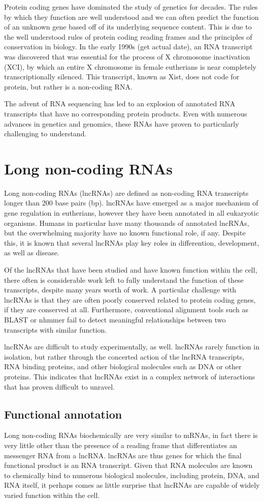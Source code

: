 Protein coding genes have dominated the study of genetics for decades. The rules by which they function are well understood and we can often predict the function of an unknown gene based off of its underlying sequence content. This is due to the well understood rules of protein coding reading frames and the principles of conservation in biology. In the early 1990s (get actual date), an RNA transcript was discovered that was essential for the process of X chromosome inactivation (XCI), by which an entire X chromosome in female eutherians is near completely transcriptionally silenced. This transcript, known as Xist, does not code for protein, but rather is a non-coding RNA.

The advent of RNA sequencing has led to an explosion of annotated RNA transcripts that have no corresponding protein products. Even with numerous advances in genetics and genomics, these RNAs have proven to particularly challenging to understand. 
\section{Long non-coding RNAs}
Long non-coding RNAs (lncRNAs) are defined as non-coding RNA transcripts longer than 200 base pairs (bp). lncRNAs have emerged as a major mechanism of gene regulation in eutherians, however they have been annotated in all eukaryotic organisms. Humans in particular have many thousands of annotated lncRNAs, but the overwhelming majority have no known functional role, if any. Despite this, it is known that several lncRNAs play key roles in differention, development, as well as disease. 

Of the lncRNAs that have been studied and have known function within the cell, there often is considerable work left to fully understand the function of these transcripts, despite many years worth of work. A particular challenge with lncRNAs is that they are often poorly conserved related to protein coding genes, if they are conserved at all. Furthermore, conventional alignment tools such as BLAST or nhmmer fail to detect meaningful relationships between two transcripts with similar function. 

lncRNAs are difficult to study experimentally, as well. lncRNAs rarely function in isolation, but rather through the concerted action of the lncRNA transcripts, RNA binding proteins, and other biological molecules such as DNA or other proteins. This indicates that lncRNAs exist in a complex network of interactions that has proven difficult to unravel. 
\subsection{Functional annotation}
Long non-coding RNAs biochemically are very similar to mRNAs, in fact there is very little other than the presence of a reading frame that differentiates an messenger RNA from a lncRNA. lncRNAs are thus genes for which the final functional product is an RNA transcript. Given that RNA molecules are known to chemically bind to numerous biological molecules, including protein, DNA, and RNA itself, it perhaps comes as little surprise that lncRNAs are capable of widely varied function within the cell. 

